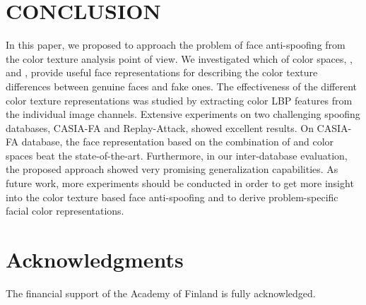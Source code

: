 \documentclass{article}
\begin{document}
	\vspace{-2mm}
\section{CONCLUSION}
	\vspace{-2mm}
\label{sec:conclusion}
In this paper, we proposed to approach the problem of face anti-spoofing from the color texture analysis point of view. We investigated which of color spaces, ,  and , provide useful face representations for describing the color texture differences between genuine faces and fake ones. The effectiveness of the different color texture representations was studied by extracting color LBP features from the individual image channels. Extensive experiments on two challenging spoofing databases, CASIA-FA and Replay-Attack, showed excellent results. On CASIA-FA database, the face representation based on the combination of  and  color spaces beat the state-of-the-art. Furthermore, in our inter-database evaluation, the proposed approach showed very promising generalization capabilities. As future work, more experiments should be conducted in order to get more insight into the color texture based face anti-spoofing and to derive problem-specific facial color representations.

\section*{Acknowledgments}
The financial support of the Academy of Finland is fully acknowledged. 



\end{document}
